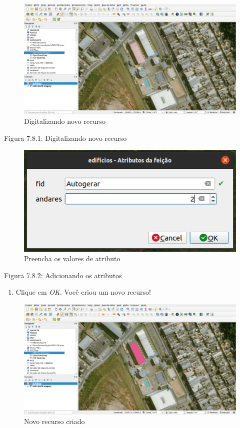 \documentclass[
]{krantz}
\providecommand{\tightlist}{%
  \setlength{\itemsep}{0pt}\setlength{\parskip}{0pt}}
\begin{document}
\begin{figure}
\centering
\includegraphics{media/modulo7/digitize-1.png}
\caption{Digitalizando novo recurso}
\end{figure}

Figura 7.8.1: Digitalizando novo recurso

\begin{figure}
\centering
\includegraphics{media/modulo7/digitize-2.png}
\caption{Preencha os valores de atributo}
\end{figure}

Figura 7.8.2: Adicionando os atributos

\begin{enumerate}
\def\labelenumi{\arabic{enumi}.}
\setcounter{enumi}{15}
\tightlist
\item
  Clique em \emph{OK}. Você criou um novo recurso!
\end{enumerate}

\begin{figure}
\centering
\includegraphics{media/modulo7/digitize-3.png}
\caption{Novo recurso criado}
\end{figure}
\end{document}

